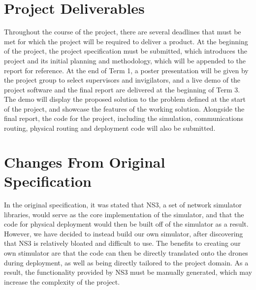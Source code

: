	\section{Project Deliverables}
	Throughout the course of the project, there are several deadlines that must be met for which the project will be required to deliver a product. At the beginning of the project, the project specification must be submitted, which introduces the project and its initial planning and methodology, which will be appended to the report for reference. At the end of Term 1, a poster presentation will be given by the project group to select supervisors and invigilators, and a live demo of the project software and the final report are delivered at the beginning of Term 3. The demo will display the proposed solution to the problem defined at the start of the project, and showcase the features of the working solution. Alongside the final report, the code for the project, including the simulation, communications routing, physical routing and deployment code will also be submitted.
	\section{Changes From Original Specification}
	In the original specification, it was stated that NS3, a set of network simulator libraries, would serve as the core implementation of the simulator, and that the code for physical deployment would then be built off of the simulator as a result. However, we have decided to instead build our own simulator, after discovering that NS3 is relatively bloated and difficult to use. The benefits to creating our own stimulator are that the code can then be directly translated onto the drones during deployment, as well as being directly tailored to the project domain. As a result, the functionality provided by NS3 must be manually generated, which may increase the complexity of the project. 
